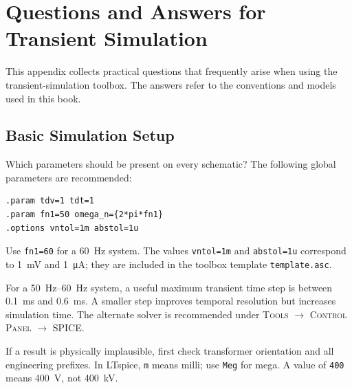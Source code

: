 \chapter[Q\&A: Transient Simulation]
{Questions and Answers for Transient Simulation}
\label{app:qa-transient-simulation}

This appendix collects practical questions that frequently arise when using
the transient-simulation toolbox. The answers refer to the conventions and
models used in this book.

\section{Basic Simulation Setup}

\begin{formulaBox}{Which parameters should be present on every schematic?}
The following global parameters are recommended:
\begin{lstlisting}[style=LTspice]
.param tdv=1 tdt=1
.param fn1=50 omega_n={2*pi*fn1}
.options vntol=1m abstol=1u
\end{lstlisting}

Use \texttt{fn1=60} for a \SI{60}{\hertz} system. The values
\texttt{vntol=1m} and \texttt{abstol=1u} correspond to
\SI{1}{\milli\volt} and \SI{1}{\micro\ampere}; they are included in the
toolbox template \texttt{template.asc}.

For a \SIrange{50}{60}{\hertz} system, a useful maximum transient time step is
between \SI{0.1}{\milli\second} and \SI{0.6}{\milli\second}. A smaller step
improves temporal resolution but increases simulation time. The alternate
solver is recommended under \textsc{Tools} $\rightarrow$
\textsc{Control Panel} $\rightarrow$ \textsc{SPICE}.

If a result is physically implausible, first check transformer orientation and
all engineering prefixes. In LTspice, \texttt{m} means milli; use
\texttt{Meg} for mega. A value of \texttt{400} means \SI{400}{\volt}, not
\SI{400}{\kilo\volt}.
\end{formulaBox}

